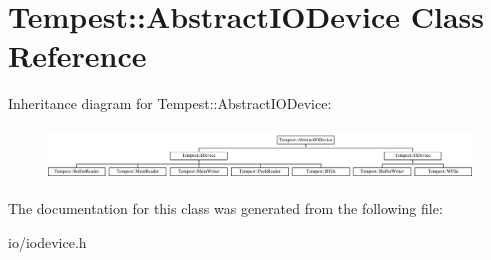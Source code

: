 \hypertarget{class_tempest_1_1_abstract_i_o_device}{\section{Tempest\+:\+:Abstract\+I\+O\+Device Class Reference}
\label{class_tempest_1_1_abstract_i_o_device}
}
Inheritance diagram for Tempest\+:\+:Abstract\+I\+O\+Device\+:\begin{figure}[H]
\begin{center}
\leavevmode
\includegraphics[height=1.395349cm]{class_tempest_1_1_abstract_i_o_device}
\end{center}
\end{figure}


The documentation for this class was generated from the following file\+:\begin{DoxyCompactItemize}
\item 
io/iodevice.\+h\end{DoxyCompactItemize}
